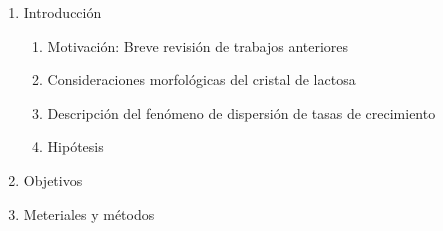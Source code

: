 
\begin{enumerate}
\item Introducción
\begin{enumerate}
	\item Motivación: Breve revisión de trabajos anteriores
	\item Consideraciones morfológicas del cristal de lactosa
	\item Descripción del fenómeno de dispersión de tasas de crecimiento
	\item Hipótesis
\end{enumerate}
\item Objetivos
\item Meteriales y métodos
\end{enumerate}


